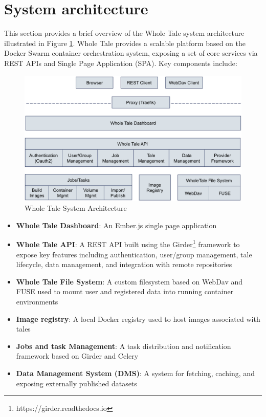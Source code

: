 \documentclass[conference]{IEEEtran}
\begin{document}
\section{System architecture} \label{architecture}

This section provides a brief overview of the Whole Tale system architecture illustrated in Figure 
\ref{fig-architecture}. Whole Tale 
provides a scalable platform based on the Docker Swarm container orchestration system, exposing a 
set of core services via REST APIs and Single Page Application (SPA). Key components include:

\begin{figure}[h]
\centering
\includegraphics[scale=0.25]{images/wholetale-architecture.png}
\caption{Whole Tale System Architecture}
\label{fig-architecture}
\end{figure}

\begin{itemize}
\item{{\bf Whole Tale Dashboard}: An Ember.js single page application}
\item{{\bf Whole Tale API}: A REST API built using the Girder\footnote{https://girder.readthedocs.io} framework to expose key features including authentication, user/group management, tale lifecycle, data management, and integration with remote repositories}
\item{{\bf Whole Tale File System}: A custom filesystem based on WebDav and FUSE used to mount user and registered data into running container environments}
\item{{\bf Image registry}: A local Docker registry used to host images associated with tales}
\item{{\bf Jobs and task Management}: A task distribution and notification framework based on Girder and Celery}
\item{{\bf Data Management System (DMS)}: A system for fetching, caching, and exposing externally published datasets}
\end{itemize}
\end{document}
